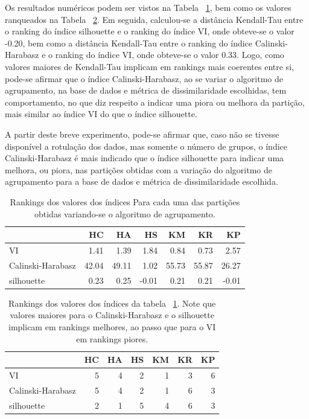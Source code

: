 Os resultados numéricos podem ser vistos na Tabela ~\ref{tbl:rankings_3}, bem como os valores ranqueados na Tabela ~\ref{tbl:rankings}. Em seguida, calculou-se a distância Kendall-Tau entre o ranking do índice silhouette e o ranking do índice VI, onde obteve-se o valor -0.20, bem como a distância Kendall-Tau entre o ranking do índice Calinski-Harabasz e o ranking do índice VI, onde obteve-se o valor 0.33. Logo, como valores maiores de Kendall-Tau implicam em rankings mais coerentes entre si, pode-se afirmar que o índice Calinski-Harabasz, ao se variar o algoritmo de agrupamento, na base de dados e métrica de dissimilaridade escolhidas, tem comportamento, no que diz respeito a indicar uma piora ou melhora da partição, mais similar ao índice VI do que o índice silhouette.

A partir deste breve experimento, pode-se afirmar que, caso não se tivesse disponível a rotulação dos dados, mas somente o número de grupos, o índice Calinski-Harabasz é mais indicado que o índice silhouette para indicar uma melhora, ou piora, nas partições obtidas com a variação do algoritmo de agrupamento para a base de dados e métrica de dissimilaridade escolhida.

	\begin{table}[!h]
		\centering
		\caption{Rankings dos valores dos índices Para cada uma das partições obtidas variando-se o algoritmo de agrupamento.} 	\label{tbl:rankings_3}
		\begin{tabular}{lrrrrrr}
			\toprule
			{} &          HC &          HA &         HS &          KM &          KR &          KP \\
			\midrule
			VI &   1.41 &   1.39 &  1.84 &   0.84 &   0.73 &   2.57 \\
			Calinski-Harabasz &  42.04 &  49.11 &  1.02 &  55.73 &  55.87 &  26.27 \\
			silhouette &   0.23 &   0.25 & -0.01 &   0.21 &   0.21 &  -0.01 \\
			\bottomrule
		\end{tabular}
			\end{table}

	\begin{table}[!h]
		\centering
		\caption{Rankings dos valores dos índices da tabela ~\ref{tbl:rankings_3}. Note que valores maiores para o Calinski-Harabasz e o silhouette implicam em rankings melhores, ao passo que para o VI em rankings piores.} 	\label{tbl:rankings}
		\begin{tabular}{lrrrrrr}
			\toprule
			{} &          HC &          HA &         HS &          KM &          KR &          KP \\			
			\midrule
			VI &  5 &  4 &  2 &  1 &  3 &  6 \\
			Calinski-Harabasz &  5 &  4 &  2 &  1 &  6 &  3 \\
			silhouette &  2 &  1 &  5 &  4 &  6 &  3 \\
			\bottomrule
		\end{tabular}
	\end{table}

